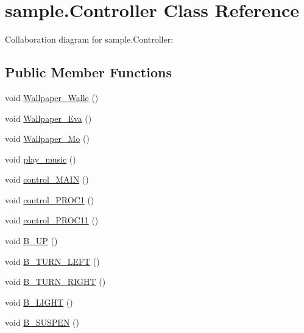 \hypertarget{classsample_1_1_controller}{}\section{sample.\+Controller Class Reference}
\label{classsample_1_1_controller}


Collaboration diagram for sample.\+Controller\+:
\subsection*{Public Member Functions}
\begin{DoxyCompactItemize}
\item 
void \mbox{\hyperlink{classsample_1_1_controller_a75b0e78fcaff17ed082954c1459e9ab9}{Wallpaper\+\_\+\+Walle}} ()
\item 
void \mbox{\hyperlink{classsample_1_1_controller_af4cf39daf47181f6c401a124caf36fe4}{Wallpaper\+\_\+\+Eva}} ()
\item 
void \mbox{\hyperlink{classsample_1_1_controller_aea439b1c1f82fafed2d06f7bb70e00ec}{Wallpaper\+\_\+\+Mo}} ()
\item 
void \mbox{\hyperlink{classsample_1_1_controller_ae0ee7069dfddeaeaf9f69829c5ce744b}{play\+\_\+music}} ()
\item 
void \mbox{\hyperlink{classsample_1_1_controller_a7930a67c98018fc75fd8460b9591c48d}{control\+\_\+\+M\+A\+IN}} ()
\item 
void \mbox{\hyperlink{classsample_1_1_controller_aa9037e3ba09588c5a7bd86f83a0a79b8}{control\+\_\+\+P\+R\+O\+C1}} ()
\item 
void \mbox{\hyperlink{classsample_1_1_controller_aa54ab4c483228688c947118ab95f0fb9}{control\+\_\+\+P\+R\+O\+C11}} ()
\item 
void \mbox{\hyperlink{classsample_1_1_controller_aa1573fe7c3d120ed37008ed70210a097}{B\+\_\+\+UP}} ()
\item 
void \mbox{\hyperlink{classsample_1_1_controller_a540072d9bf1fdeb0c489a9ae0c01ee79}{B\+\_\+\+T\+U\+R\+N\+\_\+\+L\+E\+FT}} ()
\item 
void \mbox{\hyperlink{classsample_1_1_controller_a9853f34a423793032a74b915e7fb0954}{B\+\_\+\+T\+U\+R\+N\+\_\+\+R\+I\+G\+HT}} ()
\item 
void \mbox{\hyperlink{classsample_1_1_controller_abba6b830a37f9b487c8fea0fad9be61d}{B\+\_\+\+L\+I\+G\+HT}} ()
\item 
void \mbox{\hyperlink{classsample_1_1_controller_a35bb7b602a91c6df06193604257db917}{B\+\_\+\+S\+U\+S\+P\+EN}} ()

\end{DoxyCompactItemize}
